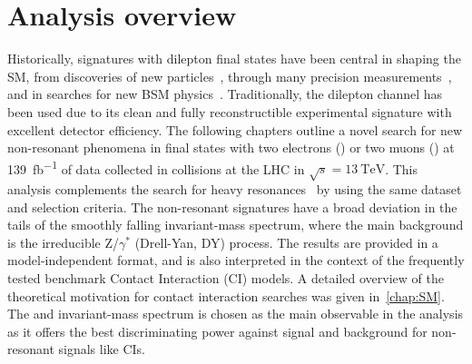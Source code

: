 \chapter*{Analysis overview}\label{chap:analyintro}


Historically, signatures with dilepton final states have been central in shaping the SM, from discoveries of new particles~\cite{PhysRevLett.33.1404, PhysRevLett.33.1406,1977PhRvL..39..252H,1983398,BAGNAIA1983130}, through many precision measurements~\cite{ALEPH:2005ab,Aad:2016zzw,Aad:2016izn,Sirunyan:2018swq}, and in searches for new BSM physics~\cite{Aad:2019fac,Sirunyan:2018exx,Sirunyan:2018ipj,EXOT-2016-05}. Traditionally, the dilepton channel has been used due to its clean and fully reconstructible experimental signature with excellent detector efficiency. The following chapters outline a novel search for new non-resonant phenomena in final states with two electrons (\ee) or two muons (\mumu) at \SI{139}{\femto\barn^{-1}} of data collected in \protonproton collisions at the LHC in $\sqrt{s}=\SI{13}{\tera\electronvolt}$. This analysis complements the search for heavy resonances~\cite{Aad:2019fac} by using the same dataset and selection criteria. The non-resonant signatures have a broad deviation in the tails of the smoothly falling invariant-mass spectrum, where the main background is the irreducible Z/$\gamma^*$ (Drell-Yan, DY) process. The results are provided in a model-independent format, and is also interpreted in the context of the frequently tested benchmark Contact Interaction (CI) models. A detailed overview of the theoretical motivation for contact interaction searches was given in~\cref{chap:SM}. The \ee and \mumu invariant-mass spectrum is chosen as the main observable in the analysis as it offers the best discriminating power against signal and background for non-resonant signals like CIs. 

